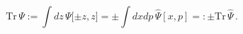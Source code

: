 \begin{equation}
\mathrm{Tr}\,\Psi :=\int dz\,\Psi \lbrack \pm z,z]=\pm \int dxdp\,\hat{\Psi}[
x,p]=:\pm \mathrm{Tr}\,\hat{\Psi}\,.
\end{equation}

